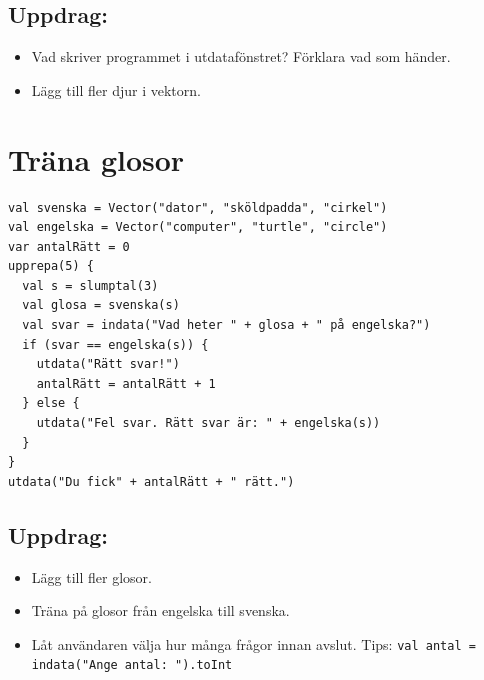 \section*{\color{BrickRed}Uppdrag:}


\begin{itemize}

\item {Vad skriver programmet i utdatafönstret? Förklara vad som händer.}
\item {Lägg till fler djur i vektorn.}

\end{itemize}


\chapter{Träna glosor}
\begin{lstlisting}[basicstyle={\ttfamily\fontsize{14}{17}\selectfont},numbers=none]
val svenska = Vector("dator", "sköldpadda", "cirkel")
val engelska = Vector("computer", "turtle", "circle")
var antalRätt = 0
upprepa(5) {
  val s = slumptal(3)
  val glosa = svenska(s)
  val svar = indata("Vad heter " + glosa + " på engelska?")
  if (svar == engelska(s)) {
    utdata("Rätt svar!")
    antalRätt = antalRätt + 1
  } else {
    utdata("Fel svar. Rätt svar är: " + engelska(s))
  }
}
utdata("Du fick" + antalRätt + " rätt.")
\end{lstlisting}
        
\section*{\color{BrickRed}Uppdrag:}


\begin{itemize}

\item {Lägg till fler glosor.}
\item {Träna på glosor från engelska till svenska.}
\item {Låt användaren välja hur många frågor innan avslut. Tips: \lstinline{val antal = indata("Ange antal: ").toInt}}

\end{itemize}


